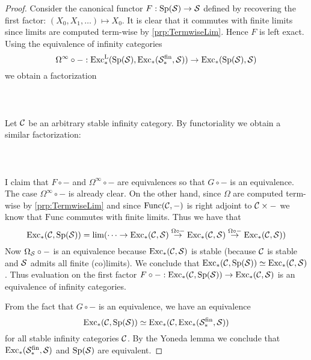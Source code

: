 \begin{thm}
\begin{proof}
Consider the canonical functor $F:\text{Sp}(\mathcal{S})\to\mathcal{S}$ defined by recovering the first factor: $(X_0,X_1,\dots)\mapsto X_0$. It is clear that it commutes with finite limits since limits are computed term-wise by \ref{prp:TermwiseLim}. Hence $F$ is left exact. Using the equivalence of infinity categories $$\Omega^\infty\circ-:\text{Exc}_\ast^\text{L}(\text{Sp}(\mathcal{S}),\text{Exc}_\ast(\mathcal{S}_\ast^\text{fin},\mathcal{S}))\to\text{Exc}_\ast (\text{Sp}(\mathcal{S}),\mathcal{S})$$ we obtain a factorization  
 \\~\\  \\~\\
Let $\mathcal{C}$ be an arbitrary stable infinity category. By functoriality we obtain a similar factorization:  
 \\~\\  \\~\\ 
I claim that $F\circ -$ and $\Omega^\infty\circ -$ are equivalences so that $G\circ -$ is an equivalence. The case $\Omega^\infty\circ -$ is already clear. On the other hand, since $\Omega$ are computed term-wise by \ref{prp:TermwiseLim} and since $\text{Func}(\mathcal{C},-)$ is right adjoint to $\mathcal{C}\times-$ we know that $\text{Func}$ commutes with finite limits. Thus we have that $$\text{Exc}_\ast(\mathcal{C},\text{Sp}(\mathcal{S}))=\lim(\cdots\rightarrow\text{Exc}_\ast (\mathcal{C},\mathcal{S})\overset{\Omega\circ-}{\rightarrow}\text{Exc}_\ast (\mathcal{C},\mathcal{S})\overset{\Omega\circ-}{\rightarrow}\text{Exc}_\ast (\mathcal{C},\mathcal{S}))$$ Now $\Omega_{\mathcal{S}}\circ -$ is an equivalence because $\text{Exc}_\ast(\mathcal{C},\mathcal{S})$ is stable (because $\mathcal{C}$ is stable and $\mathcal{S}$ admits all finite (co)limits). We conclude that $\text{Exc}_\ast (\mathcal{C},\text{Sp}(\mathcal{S}))\simeq\text{Exc}_\ast (\mathcal{C},\mathcal{S})$. Thus evaluation on the first factor $F\circ -:\text{Exc}_\ast (\mathcal{C},\text{Sp}(\mathcal{S}))\to\text{Exc}_\ast (\mathcal{C},\mathcal{S})$ is an equivalence of infinity categories. 

From the fact that $G\circ -$ is an equivalence, we have an equivalence $$\text{Exc}_\ast(\mathcal{C},\text{Sp}(\mathcal{S}))\simeq\text{Exc}_\ast(\mathcal{C},\text{Exc}_\ast(\mathcal{S}_\ast^\text{fin},\mathcal{S}))$$ for all stable infinity categories $\mathcal{C}$. By the Yoneda lemma we conclude that $\text{Exc}_\ast(\mathcal{S}_\ast^\text{fin},\mathcal{S})$ and $\text{Sp}(\mathcal{S})$ are equivalent. 
\end{proof}
\end{thm}

